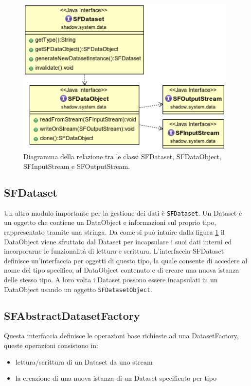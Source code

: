 \begin{figure}
\begin{center}
\includegraphics[width=11cm]{Immagini/relazione-dataset-dataobject-stream}
\caption{Diagramma della relazione tra le classi SFDataset, SFDataObject, SFInputStream e SFOutputStream.\label{f:dataset-dataobj-stream}} 
\end{center} 
\end{figure}

\subsection{SFDataset}
\label{sub:sfdataset}
Un altro modulo importante per la gestione dei dati \`e \texttt{SFDataset}. Un Dataset \`e un oggetto che contiene un DataObject e informazioni sul proprio tipo, rappresentato tramite una stringa.
Da come si pu\`o intuire dalla figura \ref{f:dataset-dataobj-stream} il DataObject viene sfruttato dal Dataset per incapsulare i suoi dati interni ed incorporarne le funzionalit\`a di lettura e scrittura.
L'interfaccia SFDataset definisce un'interfaccia per oggetti di questo tipo, la quale consente di accedere al nome del tipo specifico, al DataObject contenuto e di creare una nuova istanza delle stesso tipo.
A loro volta i Dataset possono essere incapsulati in un DataObject usando un oggetto \texttt{SFDatasetObject}.

\subsection{SFAbstractDatasetFactory}
\label{sub:sfabstractdatasetfactory}
Questa interfaccia definisce le operazioni base richieste ad una DatasetFactory, queste operazioni consistono in:
\begin{itemize}
	\item lettura/scrittura di un Dataset da uno stream
	\item la creazione di una nuova istanza di un Dataset specificato per tipo
\end{itemize}

